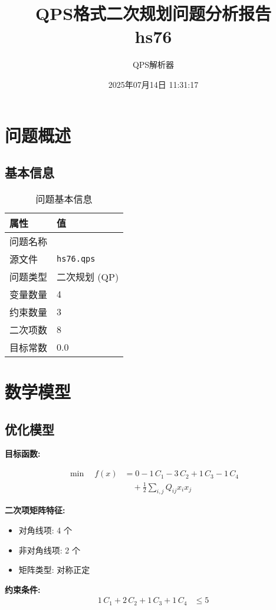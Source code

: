 \documentclass[a4paper,11pt]{article}
\title{QPS格式二次规划问题分析报告\\{\large hs76}}
\author{QPS解析器}
\date{2025年07月14日 11:31:17}
\begin{document}
\maketitle
\tableofcontents
\newpage

\section{问题概述}
\subsection{基本信息}
\begin{table}[h!]
\centering
\begin{tabular}{ll}
\toprule
\textbf{属性} & \textbf{值} \\
\midrule
问题名称 & \texttt{} \\
源文件 & \texttt{hs76.qps} \\
问题类型 & 二次规划 (QP) \\
变量数量 & 4 \\
约束数量 & 3 \\
二次项数 & 8 \\
目标常数 & 0.0 \\
\bottomrule
\end{tabular}
\caption{问题基本信息}
\end{table}

\section{数学模型}
\subsection{优化模型}

\textbf{目标函数:}

\begin{align}
\min\quad f(x) &= 0 - 1\,C_{1} - 3\,C_{2} + 1\,C_{3} - 1\,C_{4} \nonumber\\
&\quad + \frac{1}{2} \sum_{i,j} Q_{ij} x_i x_j\label{eq:objective}
\end{align}

\textbf{二次项矩阵特征:}
\begin{itemize}
\item 对角线项: 4 个
\item 非对角线项: 2 个
\item 矩阵类型: 对称正定
\end{itemize}

\textbf{约束条件:}
\begin{align}
1\,C_{1} + 2\,C_{2} + 1\,C_{3} + 1\,C_{4} &\leq 5 \nonumber
\end{align}
\end{document}
